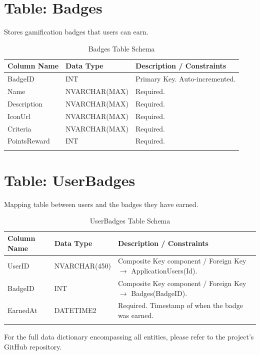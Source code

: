 \section{Table: Badges}
Stores gamification badges that users can earn.
\begin{longtable}{|l|l|p{6cm}|}
\hline
\textbf{Column Name} & \textbf{Data Type} & \textbf{Description / Constraints} \\ \hline
BadgeID & INT & Primary Key. Auto-incremented. \\ \hline
Name & NVARCHAR(MAX) & Required. \\ \hline
Description & NVARCHAR(MAX) & Required. \\ \hline
IconUrl & NVARCHAR(MAX) & Required. \\ \hline
Criteria & NVARCHAR(MAX) & Required. \\ \hline
PointsReward & INT & Required. \\ \hline
\caption{Badges Table Schema}
\end{longtable}

\section{Table: UserBadges}
Mapping table between users and the badges they have earned.
\begin{longtable}{|l|l|p{6cm}|}
\hline
\textbf{Column Name} & \textbf{Data Type} & \textbf{Description / Constraints} \\ \hline
UserID & NVARCHAR(450) & Composite Key component / Foreign Key $\rightarrow$ ApplicationUsers(Id). \\ \hline
BadgeID & INT & Composite Key component / Foreign Key $\rightarrow$ Badges(BadgeID). \\ \hline
EarnedAt & DATETIME2 & Required. Timestamp of when the badge was earned. \\ \hline
\caption{UserBadges Table Schema}
\end{longtable}

For the full data dictionary encompassing all entities, please refer to the project's GitHub repository.

